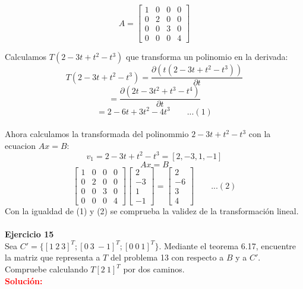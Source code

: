 \documentclass[12pt]{article}
\begin{document}
$$A=\begin{bmatrix}
  1 & 0 & 0 & 0  \\
  0 & 2 & 0 & 0 \\
  0 & 0 & 3 & 0 \\
  0 & 0 & 0 & 4
\end{bmatrix}
$$

Calculamos $T(2-3t+t^2-t^3)$ que transforma un polinomio en la derivada:
$$T(2-3t+t^2-t^3)=\frac{\partial(t(2-3t+t^2-t^3))}{\partial t}$$
$$=\frac{\partial(2t-3t^2+t^3-t^4)}{\partial t}$$
$$=2-6t+3t^2-4t^3 \qquad ...(1)$$\\

Ahora calculamos la transformada del polinommio $2-3t+t^2-t^3$ con la ecuacion $Ax=B$:
$$v_1=2-3t+t^2-t^3 = [2, -3, 1, -1]$$
$$Ax=B$$
$$
\begin{bmatrix}
    1 & 0 & 0 & 0  \\
  0 & 2 & 0 & 0 \\
  0 & 0 & 3 & 0 \\
  0 & 0 & 0 & 4
\end{bmatrix}
\begin{bmatrix}
    2\\
    -3\\
    1\\
    -1
\end{bmatrix}
=\begin{bmatrix}
    2\\
    -6\\
    3\\
    4
\end{bmatrix}
\qquad ...(2)
$$
Con la igualdad de (1) y (2) se comprueba la validez de la transformación lineal.
\\\\
\noindent \textbf{Ejercicio 15}\\

Sea $C' = \{[1 \ 2 \ 3]^T; [0 \ 3 \ -1]^T; [0 \ 0 \ 1]^T\}$. Mediante el teorema 6.17, encuentre la matriz que representa a $T$ del problema 13 con respecto a $B$ y a $C'$. Compruebe calculando $T[2 \ 1]^T$ por dos caminos.\\

\noindent \textcolor{red}{\bf Solución:}
\end{document}
